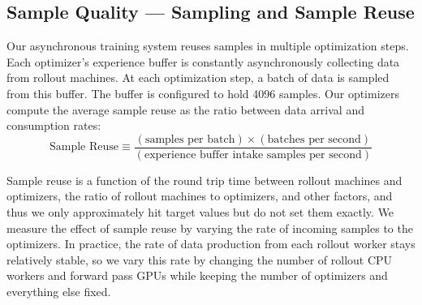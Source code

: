 \documentclass[ocean-paper.tex]{subfiles}
\begin{document}
\subsection{Sample Quality --- Sampling and Sample Reuse}\label{sec:methods:samplereuse}

Our asynchronous training system reuses samples in multiple optimization steps. 
Each optimizer's experience buffer is constantly asynchronously collecting data from rollout machines. 
At each optimization step, a batch of data is sampled from this buffer. The buffer is configured to hold 4096 samples. 
Our optimizers compute the average sample reuse as the ratio between data arrival and consumption rates:
\begin{equation}\label{eqn:sample-reuse}
    \textrm{Sample Reuse} \equiv \frac
    {\left(\textrm{samples per batch}\right) \times \left(\textrm{batches per second}\right)}
    {\left(\textrm{experience buffer intake samples per second}\right)}
\end{equation}


Sample reuse is a function of the round trip time between rollout machines and optimizers, the ratio of rollout machines to optimizers, and other factors, and thus we only approximately hit target values but do not set them exactly. 
We measure the effect of sample reuse by varying the rate of incoming samples to the optimizers. 
In practice, the rate of data production from each rollout worker stays relatively stable, so we vary this rate by changing the number of rollout CPU workers and forward pass GPUs while keeping the number of optimizers and everything else fixed.
\end{document}
